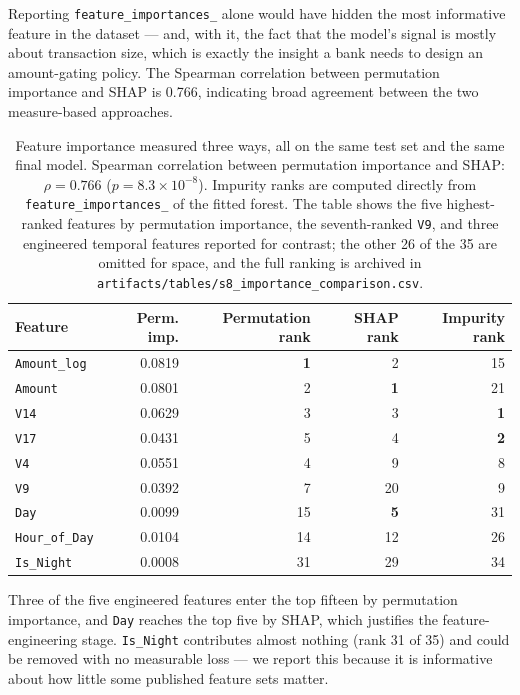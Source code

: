 Reporting \texttt{feature\_importances\_} alone would have hidden the most
informative feature in the dataset --- and, with it, the fact that the model's
signal is mostly about transaction size, which is exactly the insight a bank
needs to design an amount-gating policy. The Spearman correlation between
permutation importance and SHAP is 0.766, indicating broad agreement between
the two measure-based approaches.

\begin{table}[h!]
\centering
\caption{Feature importance measured three ways, all on the same test set and
the same final model. Spearman correlation between permutation importance and
SHAP: $\rho = 0.766$ ($p = 8.3 \times 10^{-8}$). Impurity ranks are computed
directly from \texttt{feature\_importances\_} of the fitted forest. The table shows
the five highest-ranked features by permutation importance, the seventh-ranked
\texttt{V9}, and three engineered temporal features reported for contrast; the
other 26 of the 35 are omitted for space, and the full ranking is archived in
\texttt{artifacts/tables/s8\_importance\_comparison.csv}.}
\label{tab:imp}
\begin{tabular}{lrrrr}
\toprule
\textbf{Feature} & \textbf{Perm. imp.} & \textbf{Permutation rank} & \textbf{SHAP rank} & \textbf{Impurity rank} \\
\midrule
\texttt{Amount\_log} & 0.0819 & \textbf{1} & 2 & 15 \\
\texttt{Amount} & 0.0801 & 2 & \textbf{1} & 21 \\
\texttt{V14} & 0.0629 & 3 & 3 & \textbf{1} \\
\texttt{V17} & 0.0431 & 5 & 4 & \textbf{2} \\
\texttt{V4} & 0.0551 & 4 & 9 & 8 \\
\texttt{V9} & 0.0392 & 7 & 20 & 9 \\
\texttt{Day} & 0.0099 & 15 & \textbf{5} & 31 \\
\texttt{Hour\_of\_Day} & 0.0104 & 14 & 12 & 26 \\
\texttt{Is\_Night} & 0.0008 & 31 & 29 & 34 \\
\bottomrule
\end{tabular}
\end{table}

Three of the five engineered features enter the top fifteen by permutation
importance, and \texttt{Day} reaches the top five by SHAP, which justifies the
feature-engineering stage. \texttt{Is\_Night} contributes almost nothing (rank
31 of 35) and could be removed with no measurable loss --- we report this
because it is informative about how little some published feature sets matter.

